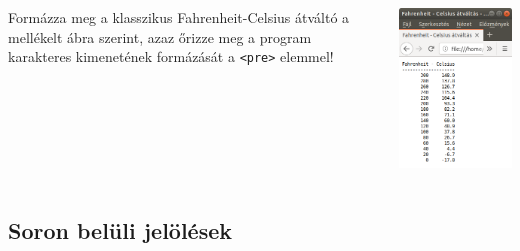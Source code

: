 \documentclass[usenames,dvipsnames,aspectratio=169]{beamer}
\begin{document}
\begin{frame}
  \begin{columns}[c]
      Formázza meg a klasszikus Fahrenheit-Celsius átváltó 
        
      a mellékelt ábra szerint, azaz őrizze meg a program karakteres kimenetének formázását 
      a \texttt{<pre>} elemmel!
      \begin{center}
        \begin{exampleblock}{}
          \centering \includegraphics[scale=.35]{fahrcels.png}
        \end{exampleblock}
      \end{center}
  \end{columns}
\end{frame}

\subsection{Soron belüli jelölések}
\end{document}
